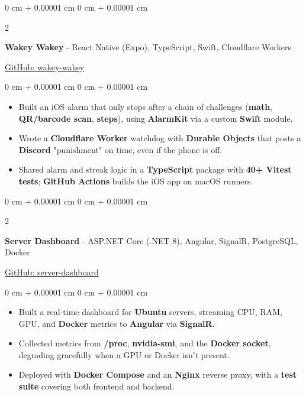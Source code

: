 \documentclass[9pt, letterpaper]{extarticle}
\newenvironment{highlights}{
    \begin{itemize}[
        topsep=0.10 cm,
        parsep=0.10 cm,
        partopsep=0pt,
        itemsep=0pt,
        leftmargin=0 cm + 10pt
    ]
}{
    \end{itemize}
} %
\newenvironment{onecolentry}{
    \begin{adjustwidth}{
        0 cm + 0.00001 cm
    }{
        0 cm + 0.00001 cm
    }
}{
    \end{adjustwidth}
} %
\newenvironment{twocolentry}[2][]{
    \onecolentry
    \def\secondColumn{#2}
    \setcolumnwidth{\fill, 4.5 cm}
    \begin{paracol}{2}
}{
    \switchcolumn \raggedleft \secondColumn
    \end{paracol}
    \endonecolentry
} %
\begin{document}
        \vspace{0.2 cm}

        \begin{twocolentry}
        {\href{https://github.com/ayushtvora/wakey-wakey}{GitHub: wakey-wakey}}
            \textbf{Wakey Wakey} - React Native (Expo), TypeScript, Swift, Cloudflare Workers
        \end{twocolentry}
        \vspace{0.10 cm}
        \begin{onecolentry}
            \begin{highlights}
                \item Built an iOS alarm that only stops after a chain of challenges (\textbf{math}, \textbf{QR/barcode scan}, \textbf{steps}), using \textbf{AlarmKit} via a custom \textbf{Swift} module.
                \item Wrote a \textbf{Cloudflare Worker} watchdog with \textbf{Durable Objects} that posts a \textbf{Discord} "punishment" on time, even if the phone is off.
                \item Shared alarm and streak logic in a \textbf{TypeScript} package with \textbf{40+ Vitest tests}; \textbf{GitHub Actions} builds the iOS app on macOS runners.
            \end{highlights}
        \end{onecolentry}

        \vspace{0.2 cm}

        \begin{twocolentry}
        {\href{https://github.com/ayushtvora/server-dashboard}{GitHub: server-dashboard}}
            \textbf{Server Dashboard} - ASP.NET Core (.NET 8), Angular, SignalR, PostgreSQL, Docker
        \end{twocolentry}
        \vspace{0.10 cm}
        \begin{onecolentry}
            \begin{highlights}
                \item Built a real-time dashboard for \textbf{Ubuntu} servers, streaming CPU, RAM, GPU, and \textbf{Docker} metrics to \textbf{Angular} via \textbf{SignalR}.
                \item Collected metrics from \textbf{/proc}, \textbf{nvidia-smi}, and the \textbf{Docker socket}, degrading gracefully when a GPU or Docker isn't present.
                \item Deployed with \textbf{Docker Compose} and an \textbf{Nginx} reverse proxy, with a \textbf{test suite} covering both frontend and backend.
            \end{highlights}
        \end{onecolentry}
\end{document}
